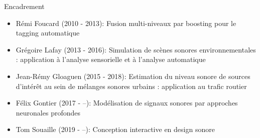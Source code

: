 \begin{frame}{Encadrement}
\begin{itemize}
  \item Rémi Foucard (2010 - 2013): \og Fusion multi-niveaux par boosting pour le tagging automatique \fg
  \item Grégoire Lafay (2013 - 2016): \og Simulation de scènes sonores environnementales : application à l'analyse sensorielle et à l'analyse automatique \fg
  \item Jean-Rémy Gloaguen (2015 - 2018): \og Estimation du niveau sonore de sources d'intérêt au sein de mélanges sonores urbains : application au trafic routier \fg
  \item Félix Gontier (2017 - --): \og Modélisation de signaux sonores par approches neuronales profondes \fg
  \item Tom Souaille (2019 - --): \og Conception interactive en design sonore \fg
\end{itemize}
\end{frame}
